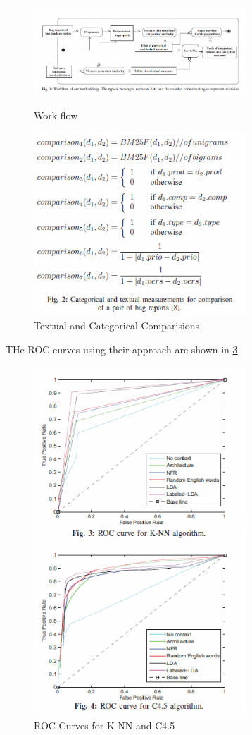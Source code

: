 \documentclass[]{sig-alternate-05-2015}
\begin{document}
\begin{figure}[h]
\includegraphics[width=8cm]{fig1.png}
\label{fig:read51}
\caption{Work flow}
\end{figure}

\begin{figure}[h]
\includegraphics[width=8cm]{fig2.png}
\caption{Textual and Categorical Comparisions}
\label{fig:read52}
\end{figure}

 THe ROC curves using their approach are shown in \ref{fig:read534}.
 
 \begin{figure}
 \includegraphics[width=8cm]{fig34.png}
 \caption{ROC Curves for K-NN and C4.5}
 \label{fig:read534}
 \end{figure}
\end{document}
